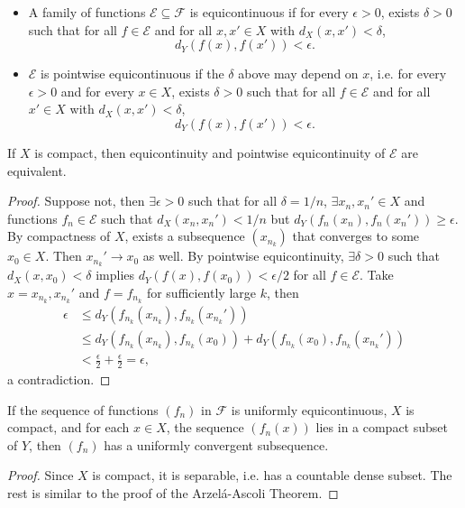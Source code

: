 \begin{df}
    \nobreakspace
    \begin{itemize}
        \item A family of functions $\mathcal E \subseteq \mathcal F$ is equicontinuous if for every $\epsilon > 0$, exists $\delta > 0$ such that for all $f \in \mathcal E$ and for all $x, x' \in X$ with $d_X(x, x') < \delta$,
        \[
        d_Y(f(x), f(x')) < \epsilon.
        \]
        \item $\mathcal E$ is pointwise equicontinuous if the $\delta$ above may depend on $x$, i.e. for every $\epsilon > 0$ and for every $x \in X$, exists $\delta > 0$ such that for all $f \in \mathcal E$ and for all $x' \in X$ with $d_X(x, x') < \delta$,
        \[
        d_Y(f(x), f(x')) < \epsilon.
        \]
    \end{itemize}
\end{df}

\begin{prop}
    If $X$ is compact, then equicontinuity and pointwise equicontinuity of $\mathcal E$ are equivalent.
    \begin{proof}
        Suppose not, then $\exists \epsilon > 0$ such that for all $\delta = 1/n$, $\exists x_n, x_n' \in X$ and functions $f_n \in \mathcal E$ such that $d_X(x_n, x_n') < 1/n$ but $d_Y(f_n(x_n), f_n(x_n')) \geq \epsilon$. By compactness of $X$, exists a subsequence $(x_{n_k})$ that converges to some $x_0 \in X$. Then $x_{n_k}' \to x_0$ as well. By pointwise equicontinuity, $\exists \delta > 0$ such that $d_X(x, x_0) < \delta$ implies $d_Y(f(x), f(x_0)) < \epsilon/2$ for all $f \in \mathcal E$. Take $x = x_{n_k}, x_{n_k}'$ and $f = f_{n_k}$ for sufficiently large $k$, then
        \begin{align*}
            \epsilon &\leq d_Y(f_{n_k}(x_{n_k}), f_{n_k}(x_{n_k}')) \\
            &\leq d_Y(f_{n_k}(x_{n_k}), f_{n_k}(x_0)) + d_Y(f_{n_k}(x_0), f_{n_k}(x_{n_k}')) \\
            &< \frac{\epsilon}{2} + \frac{\epsilon}{2} = \epsilon,
        \end{align*}
        a contradiction.
    \end{proof}
\end{prop}

\begin{prop}
    If the sequence of functions $(f_n)$ in $\mathcal F$ is uniformly equicontinuous, $X$ is compact, and for each $x \in X$, the sequence $(f_n(x))$ lies in a compact subset of $Y$, then $(f_n)$ has a uniformly convergent subsequence.
    \begin{proof}
        Since $X$ is compact, it is separable, i.e. has a countable dense subset. The rest is similar to the proof of the Arzel\'a-Ascoli Theorem.
    \end{proof}
\end{prop}

